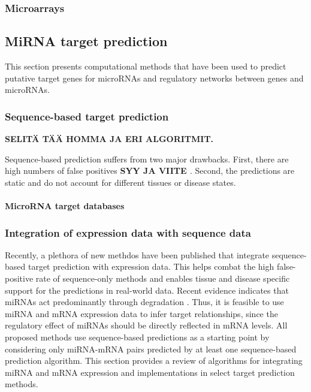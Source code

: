 \subsubsection{Microarrays}







\subsection{MiRNA target prediction}\label{mirna-target-prediction}

This section presents computational methods that have been used to predict
putative target genes for microRNAs and regulatory networks between genes and
microRNAs.





\subsubsection{Sequence-based target prediction}\label{sequence-based-target-
prediction}

\textbf{SELITÄ TÄÄ HOMMA JA ERI ALGORITMIT.}

Sequence-based prediction suffers from two major drawbacks. First, there are
high numbers of false positives \textbf{SYY JA VIITE
\citep{Sethupathy2006?}}. Second, the predictions are static and do not
account for different tissues or disease states.


\paragraph{MicroRNA target databases}





\subsubsection{Integration of expression data with sequence data}\label
{integration-of-expression-data-with-sequence-data}

Recently, a plethora of new methdos have been published that integrate
sequence-based target prediction with expression data. This helps combat the
high false-positive rate of sequence-only methods and enables tissue and
disease specific support for the predictions in real-world data. Recent
evidence indicates that miRNAs act predominantly through degradation
\citep{CITE}. Thus, it is feasible to use miRNA and mRNA expression data to
infer target relationships, since the regulatory effect of miRNAs should be
directly reflected in mRNA levels. All proposed methods use sequence-based
predictions as a starting point by considering only miRNA-mRNA pairs predicted
by at least one sequence-based prediction algorithm. This section provides a
review of algorithms for integrating miRNA and mRNA expression and
implementations in select target prediction methods.


